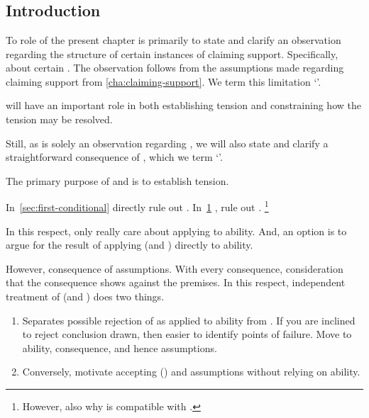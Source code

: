 \chapter{}
\label{sec:second-conditional}

\section{Introduction}
\label{sec:introduction}
\label{sec:outline-lcs}

\begin{note}
  To role of the present chapter is primarily to state and clarify an observation regarding the structure of certain instances of claiming support.
  {\color{red} Specifically, about certain .}
  The observation follows from the assumptions made regarding claiming support from \ref{cha:claiming-support}.
  We term this limitation `'.

  \LCS{} will have an important role in both establishing tension and constraining how the tension may be resolved.

  Still, as \LCS{} is solely an observation regarding , we will also state and clarify a straightforward consequence of \LCS{}, which we term `'.
\end{note}

\begin{note}
  The primary purpose of \LCS{} and \FCS{} is to establish tension.

  In~\autoref{sec:first-conditional} \ESU{} directly rule out \adB{}.
  In~\ref{sec:second-conditional} \LCS{}, \FCS{} rule out \adA{}.\nolinebreak
  \footnote{
    However, also why \LCS{} is compatible with \adB{}.
  }

  In this respect, only really care about applying \LCS{} to ability.
  And, an option is to argue for the result of applying \LCS{} (and \FCS{}) directly to ability.

  However, consequence of assumptions.
  With every consequence, consideration that the consequence shows against the premises.
  In this respect, independent treatment of \LCS{} (and \FCS{}) does two things.

  \begin{enumerate}
  \item Separates possible rejection of \LCS{} as applied to ability from \LCS{}.
    If you are inclined to reject conclusion drawn, then easier to identify points of failure.
    Move to ability, consequence, and hence assumptions.
  \item Conversely, motivate accepting \LCS{} (\FCS{}) and assumptions without relying on ability.
  \end{enumerate}
\end{note}

